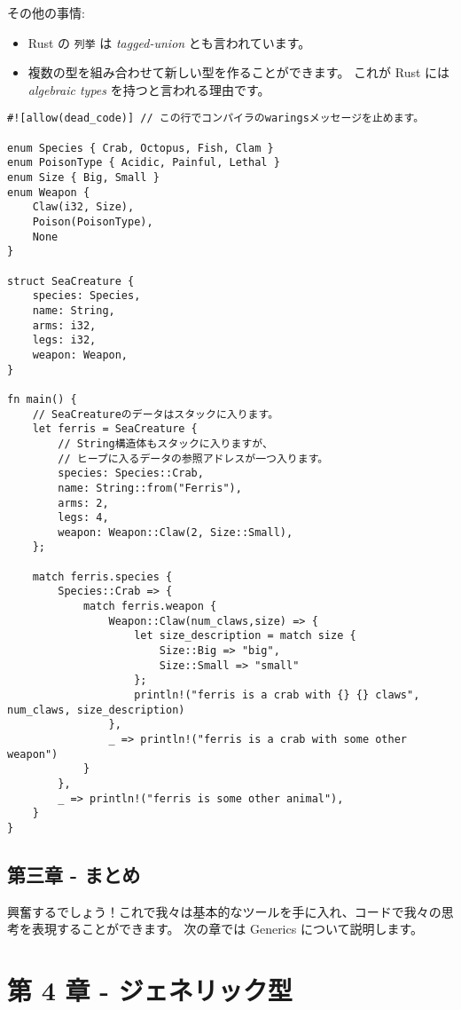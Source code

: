 その他の事情:

\begin{itemize}
\item
  Rust の \texttt{列挙} は \emph{tagged-union} とも言われています。
\item
  複数の型を組み合わせて新しい型を作ることができます。 これが Rust には
  \emph{algebraic types} を持つと言われる理由です。
\end{itemize}

\begin{verbatim}
#![allow(dead_code)] // この行でコンパイラのwaringsメッセージを止めます。

enum Species { Crab, Octopus, Fish, Clam }
enum PoisonType { Acidic, Painful, Lethal }
enum Size { Big, Small }
enum Weapon {
    Claw(i32, Size),
    Poison(PoisonType),
    None
}

struct SeaCreature {
    species: Species,
    name: String,
    arms: i32,
    legs: i32,
    weapon: Weapon,
}

fn main() {
    // SeaCreatureのデータはスタックに入ります。
    let ferris = SeaCreature {
        // String構造体もスタックに入りますが、
        // ヒープに入るデータの参照アドレスが一つ入ります。
        species: Species::Crab,
        name: String::from("Ferris"),
        arms: 2,
        legs: 4,
        weapon: Weapon::Claw(2, Size::Small),
    };

    match ferris.species {
        Species::Crab => {
            match ferris.weapon {
                Weapon::Claw(num_claws,size) => {
                    let size_description = match size {
                        Size::Big => "big",
                        Size::Small => "small"
                    };
                    println!("ferris is a crab with {} {} claws", num_claws, size_description)
                },
                _ => println!("ferris is a crab with some other weapon")
            }
        },
        _ => println!("ferris is some other animal"),
    }
}
\end{verbatim}

\subsection{第三章 - まとめ}

興奮するでしょう！これで我々は基本的なツールを手に入れ、コードで我々の思考を表現することができます。
次の章では Generics について説明します。

\section{第 4 章 - ジェネリック型}

